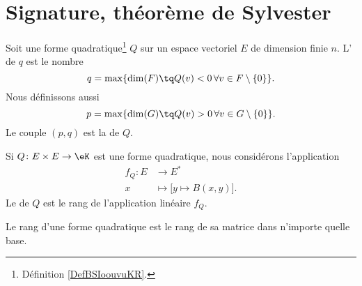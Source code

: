 \section{Signature, théorème de Sylvester}

\begin{definition}       \label{DEFooWDCLooDkRYLK}
	Soit une forme quadratique\footnote{Définition \ref{DefBSIoouvuKR}.} \( Q\) sur un espace vectoriel \( E\) de dimension finie \( n\). L' de \( q\) est le nombre
	\begin{equation}
		q=\max\{ \dim(F)\tq Q(v)<0\,\forall v\in F\setminus\{ 0 \} \}.
	\end{equation}
	Nous définissons aussi
	\begin{equation}
		p=\max\{ \dim(G)\tq Q(v)>0\,\forall v\in G\setminus\{ 0 \} \}.
	\end{equation}
	Le couple \( (p,q)\) est la  de \( Q\).
\end{definition}

\begin{definition}        \label{DEFooVITQooQaMaTF}
	Si \( Q\colon E\times E\to \eK\) est une forme quadratique, nous considérons l'application
	\begin{equation}
		\begin{aligned}
			f_Q\colon E & \to E^*                              \\
			x           & \mapsto \big[ y\mapsto B(x,y) \big].
		\end{aligned}
	\end{equation}
	Le  de \( Q\) est le rang de l'application linéaire \( f_Q\).
\end{definition}

\begin{proposition}     \label{PROPooLRZQooSfprff}
	Le rang d'une forme quadratique est le rang de sa matrice dans n'importe quelle base.
\end{proposition}

